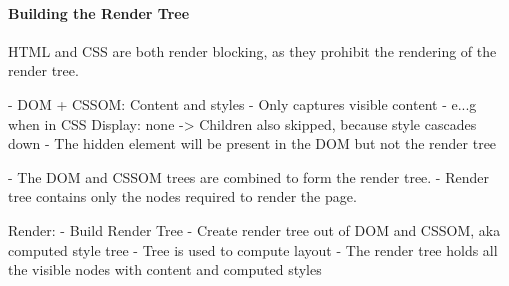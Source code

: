 
















\paragraph{Building the Render Tree}


HTML and CSS are both render blocking, as they prohibit the rendering of the render tree.

- DOM + CSSOM: Content and styles
- Only captures visible content
- e...g when in CSS Display: none -> Children also skipped, because style cascades down
- The hidden element will be present in the DOM but not the render tree

- The DOM and CSSOM trees are combined to form the render tree.
- Render tree contains only the nodes required to render the page.



Render:
- Build Render Tree
- Create render tree out of DOM and CSSOM, aka computed style tree
- Tree is used to compute layout
- The render tree holds all the visible nodes with content and computed styles



